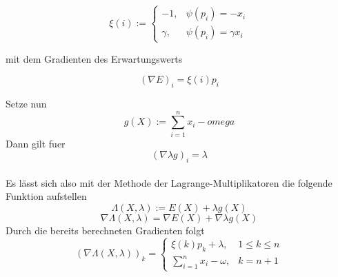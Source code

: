 \documentclass[11pt]{scrartcl}
\begin{document}
			\begin{center}
				\[ \xi(i) :=
					\begin{cases}
						-1, & \psi(p_{i})=-x_{i} \\
						\gamma, & \psi(p_{i})=\gamma x_{i}
					\end{cases}
				\]
			\end{center}
			mit dem Gradienten des Erwartungswerts
			\begin{center}
				\[(\nabla E)_{i}=\xi(i)p_{i}\]
			\end{center}
			Setze nun \[g(X):=\sum_{i=1}^{n}x_{i}-{omega}\]
			Dann gilt fuer \[(\nabla \lambda g)_{i} = \lambda\]\\
			Es lässt sich also mit der Methode der Lagrange-Multiplikatoren die folgende Funktion aufstellen \[\Lambda(X,\lambda) := E(X)+\lambda g(X)\]
			\[\nabla \Lambda(X,\lambda) = \nabla E(X) + \nabla \lambda g(X)\]
			Durch die bereits berechneten Gradienten folgt
			\[(\nabla \Lambda (X,\lambda))_{k}=
				\begin{cases}
					\xi (k)p_{k}+\lambda, & 1\leq k\leq n\\
					\sum_{i=1}^{n}x_{i}-\omega, & k = n+1
				\end{cases}\]
\end{document}
